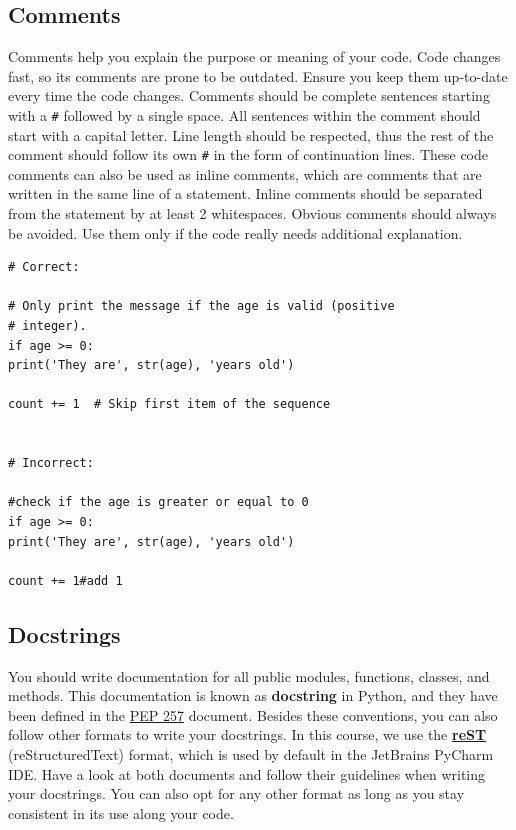 \documentclass{tufte-handout}
\begin{document}
\subsection{Comments}

Comments help you explain the purpose or meaning of your code.
Code changes fast, so its comments are prone to be outdated.
Ensure you keep them up-to-date every time the code changes.
Comments should be complete sentences starting with a \texttt{\#} followed by a single space.
All sentences within the comment should start with a capital letter.
Line length should be respected, thus the rest of the comment should follow its own \texttt{\#} in the form of continuation lines.
These code comments can also be used as inline comments, which are comments that are written in the same line of a statement.
Inline comments should be separated from the statement by at least 2 whitespaces.
Obvious comments should always be avoided. 
Use them only if the code really needs additional explanation.

\begin{mdframed}
\begin{verbatim}
# Correct:

# Only print the message if the age is valid (positive 
# integer).
if age >= 0: 
print('They are', str(age), 'years old')

count += 1  # Skip first item of the sequence


# Incorrect:

#check if the age is greater or equal to 0
if age >= 0: 
print('They are', str(age), 'years old')

count += 1#add 1
\end{verbatim}
\end{mdframed}

\subsection{Docstrings}
You should write documentation for all public modules, functions, classes, and methods.
This documentation is known as \textbf{docstring} in Python, and they have been defined in the \href{https://peps.python.org/pep-0257/}{PEP 257} document.
Besides these conventions, you can also follow other formats to write your docstrings.
In this course, we use the \href{https://www.sphinx-doc.org/en/master/usage/restructuredtext/basics.html}{\textbf{reST}} (reStructuredText) format, which is used by default in the JetBrains PyCharm IDE.
Have a look at both documents and follow their guidelines when writing your docstrings.
You can also opt for any other format as long as you stay consistent in its use along your code.
\end{document}
